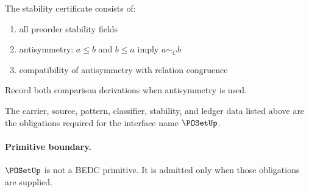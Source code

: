 \begin{definition}
\label{def:poset-stability-certificate}
The stability certificate consists of:
\begin{enumerate}
  \item all preorder stability fields
  \item antisymmetry: $a\le b$ and $b\le a$ imply $a\sim_C b$
  \item compatibility of antisymmetry with relation congruence
\end{enumerate}
\end{definition}

\begin{definition}
\label{def:poset-ledger-policy}
Record both comparison derivations when antisymmetry is used.
\end{definition}

\begin{definition}
\label{def:poset-certificate-obligations}
The carrier, source, pattern, classifier, stability, and ledger data listed above are the obligations required for the interface name $\POSetUp$.
\end{definition}

\paragraph{Primitive boundary.}
$\POSetUp$ is not a BEDC primitive. It is admitted only when those obligations are supplied.

